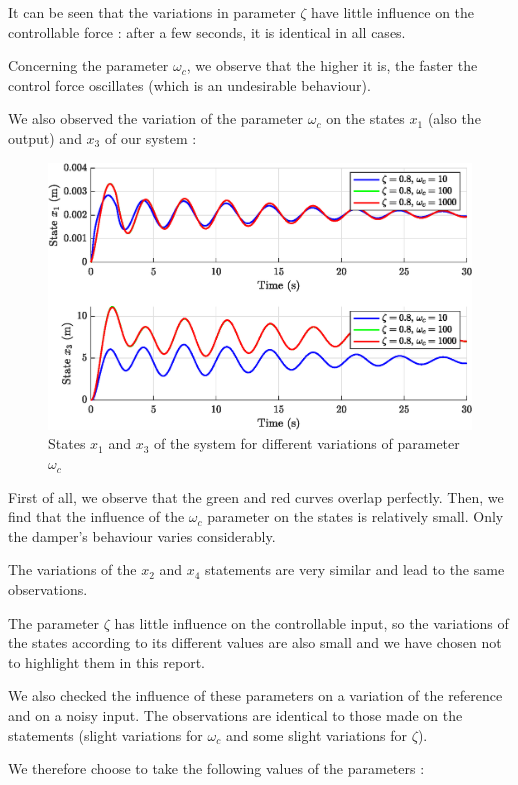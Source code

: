 It can be seen that the variations in parameter $\zeta$ have little influence on the controllable force : after a few seconds, it is identical in all cases.\par
Concerning the parameter $\omega_c$, we observe that the higher it is, the faster the control force oscillates (which is an undesirable behaviour).\par
We also observed the variation of the parameter $\omega_c$ on the states $x_1$ (also the output) and $x_3$ of our system :
\begin{figure}[H]
    \centering
    \includegraphics[width=\textwidth]{resources/eps/3_states-variations.eps}
    \caption{States $x_1$ and $x_3$ of the system for different variations of parameter $\omega_c$}
\end{figure}
First of all, we observe that the green and red curves overlap perfectly. Then, we find that the influence of the $\omega_c$ parameter on the states is relatively small. Only the damper's behaviour varies considerably.\par
The variations of the $x_2$ and $x_4$ statements are very similar and lead to the same observations.\par
The parameter $\zeta$ has little influence on the controllable input, so the variations of the states according to its different values are also small and we have chosen not to highlight them in this report.\par
We also checked the influence of these parameters on a variation of the reference and on a noisy input. The observations are identical to those made on the statements (slight variations for $\omega_c$ and some slight variations for $\zeta$).\par
We therefore choose to take the following values of the parameters :
